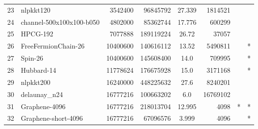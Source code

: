 \begin{tabular}{|l|l|r|r|S[round-mode=places,round-precision=2]|r|r|c|}
{23}& {nlpkkt120}	& 3542400	& 96845792	& 27.339	& 1814521	& {} &	\\
{24}& {channel-500x100x100-b050}	& 4802000	& 85362744	& 17.776	& 600299	& {} &	\\
{25}& {HPCG-192}	& 7077888	& 189119224	& 26.72	& 37057	& {} &	\\
{26}& {FreeFermionChain-26}	& 10400600	& 140616112	& 13.52	& 5490811	& {} &	{*}\\
{27}& {Spin-26}	& 10400600	& 145608400	& 14.0	& 709995	& {} &	{*}\\
{28}& {Hubbard-14}	& 11778624	& 176675928	& 15.0	& 3171168	& {} &	{*}\\
{29}& {nlpkkt200}	& 16240000	& 448225632	& 27.6	& 8240201	& {} &	\\
{30}& {delaunay\_n24}	& 16777216	& 100663202	& 6.0	& 16769102	& {} &	\\
{31}& {Graphene-4096}	& 16777216	& 218013704	& 12.995	& 4098	& {*} &	{*}\\
{32}& {Graphene-short-4096}	& 16777216	& 67096576	& 3.999	& 4096	& {} &	{*}\\
\bottomrule
\end{tabular}


